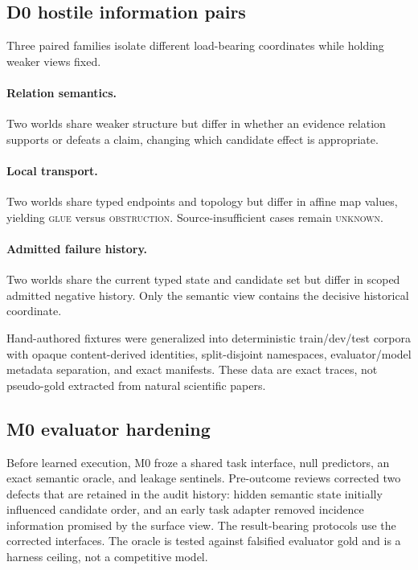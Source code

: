 \documentclass[10pt]{article}
\begin{document}
\subsection{D0 hostile information pairs}

Three paired families isolate different load-bearing coordinates while holding weaker views fixed.

\paragraph{Relation semantics.}
Two worlds share weaker structure but differ in whether an evidence relation supports or defeats a claim, changing which candidate effect is appropriate.

\paragraph{Local transport.}
Two worlds share typed endpoints and topology but differ in affine map values, yielding \textsc{glue} versus \textsc{obstruction}. Source-insufficient cases remain \textsc{unknown}.

\paragraph{Admitted failure history.}
Two worlds share the current typed state and candidate set but differ in scoped admitted negative history. Only the semantic view contains the decisive historical coordinate.

Hand-authored fixtures were generalized into deterministic train/dev/test corpora with opaque content-derived identities, split-disjoint namespaces, evaluator/model metadata separation, and exact manifests. These data are exact traces, not pseudo-gold extracted from natural scientific papers.

\subsection{M0 evaluator hardening}

Before learned execution, M0 froze a shared task interface, null predictors, an exact semantic oracle, and leakage sentinels. Pre-outcome reviews corrected two defects that are retained in the audit history: hidden semantic state initially influenced candidate order, and an early task adapter removed incidence information promised by the surface view. The result-bearing protocols use the corrected interfaces. The oracle is tested against falsified evaluator gold and is a harness ceiling, not a competitive model.
\end{document}
